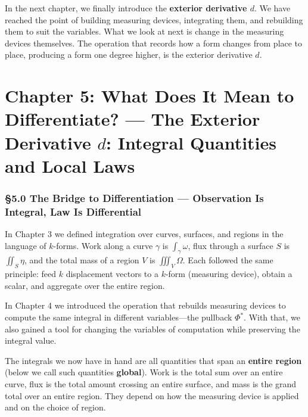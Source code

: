 \documentclass[a4paper,12pt,openany]{book}
\begin{document}
In the next chapter, we finally introduce the
\textbf{exterior derivative $d$}. We have reached the point of building
measuring devices, integrating them, and rebuilding them to suit the
variables. What we look at next is change in the measuring devices
themselves. The operation that records how a form changes from place to
place, producing a form one degree higher, is the exterior derivative
\(d\).

\newpage

\hypertarget{chapter-5-what-does-it-mean-to-differentiate-the-exterior-derivative-d-integral-quantities-and-local-laws}{%
\chapter{\texorpdfstring{Chapter 5: What Does It Mean to Differentiate?
— The Exterior Derivative \(d\): Integral Quantities and Local
Laws}{Chapter 5: What Does It Mean to Differentiate? — The Exterior Derivative d: Integral Quantities and Local Laws}}\label{chapter-5-what-does-it-mean-to-differentiate-the-exterior-derivative-d-integral-quantities-and-local-laws}}

\hypertarget{the-bridge-to-differentiation-observation-is-integral-law-is-differential}{%
\subsection{§5.0 The Bridge to Differentiation — Observation Is
Integral, Law Is
Differential}\label{the-bridge-to-differentiation-observation-is-integral-law-is-differential}}

In Chapter 3 we defined integration over curves, surfaces, and regions
in the language of \(k\)-forms. Work along a curve \(\gamma\) is
\(\int_\gamma \omega\), flux through a surface \(S\) is
\(\iint_S \eta\), and the total mass of a region \(V\) is
\(\iiint_V \Omega\). Each followed the same principle: feed \(k\)
displacement vectors to a \(k\)-form (measuring device), obtain a
scalar, and aggregate over the entire region.

In Chapter 4 we introduced the operation that rebuilds measuring devices
to compute the same integral in different variables—the pullback
\(\Phi^*\). With that, we also gained a tool for changing the variables
of computation while preserving the integral value.

The integrals we now have in hand are all quantities that span an
\textbf{entire region} (below we call such quantities \textbf{global}).
Work is the total sum over an entire curve, flux is the total amount
crossing an entire surface, and mass is the grand total over an entire
region. They depend on how the measuring device is applied and on the
choice of region.
\end{document}
